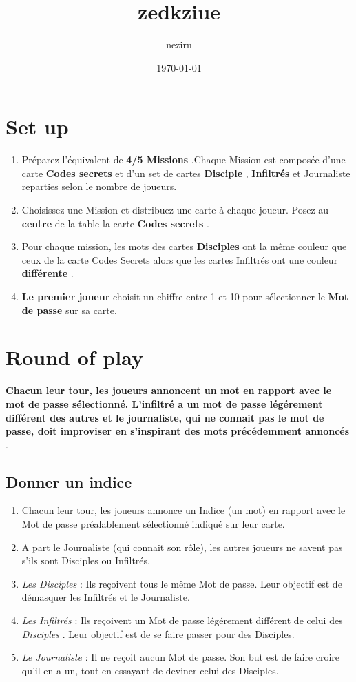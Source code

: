 \documentclass{article}%
\title{zedkziue}%
\author{nezirn}%
\date{\today}%
\begin{document}
%
\pagestyle{empty}%
\normalsize%
\maketitle%
\section{ Set up
}%
\label{sec:Setup}%
\begin{enumerate}%
\item%
%
 Préparez l'équivalent de %
\textbf{4/5 Missions}%
.Chaque Mission est composée d'une carte %
\textbf{Codes secrets}%
 et d'un set de cartes %
\textbf{Disciple}%
,%
\textbf{ Infiltrés }%
 et Journaliste reparties selon le nombre de joueurs.
%
\item%
%
 Choisissez une Mission et distribuez une carte à chaque joueur. Posez au %
\textbf{centre}%
 de la table la carte %
\textbf{Codes secrets}%
.
%
\item%
%
 Pour chaque mission, les mots des cartes %
\textbf{Disciples}%
 ont la même couleur que ceux de la carte Codes Secrets alors que les cartes Infiltrés ont une couleur %
\textbf{différente}%
.
%
\item%
%
\textbf{Le premier joueur}%
 choisit un chiffre entre 1 et 10 pour sélectionner le %
\textbf{Mot de passe}%
 sur sa carte.
%
\end{enumerate}

%
\section{ Round of play
}%
\label{sec:Roundofplay}%
\textbf{Chacun leur tour, les joueurs annoncent un mot en rapport avec le mot de passe sélectionné. L'infiltré a un mot de passe légérement différent des autres et le journaliste, qui ne connait pas le mot de passe, doit improviser en s'inspirant des mots précédemment annoncés}%
.


%
\subsection{ Donner un indice
}%
\label{subsec:Donnerunindice}%
\begin{enumerate}%
\item%
%
 Chacun leur tour, les joueurs annonce un Indice (un mot) en rapport avec le Mot de passe préalablement sélectionné indiqué sur leur carte.
%
\item%
%
 A part le Journaliste (qui connait son rôle), les autres joueurs ne savent pas s'ils sont Disciples ou Infiltrés.
%
\item%
%
\textit{Les Disciples}%
 : Ils reçoivent tous le même Mot de passe. Leur objectif est de démasquer les Infiltrés et le Journaliste.
%
\item%
%
\textit{Les Infiltrés}%
 : Ils reçoivent un Mot de passe légérement différent de celui des %
\textit{Disciples}%
. Leur objectif est de se faire passer pour des Disciples.
%
\item%
%
\textit{Le Journaliste}%
 : Il ne reçoit aucun Mot de passe. Son but est de faire croire qu'il en a un, tout en essayant de deviner celui des Disciples.
%
\end{enumerate}
\end{document}
